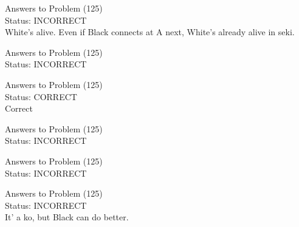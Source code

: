 \documentclass[11pt]{article}
\begin{document}
\begin{minipage}[t]{0.5\textwidth}
  {\centering
  
  Answers to Problem (125)\\
  Status: INCORRECT\\
  White's alive. Even if Black connects at A next, White's already alive in seki.\\
  }
\end{minipage}
\begin{minipage}[t]{0.5\textwidth}
  {\centering
  
  Answers to Problem (125)\\
  Status: INCORRECT\\
  
  }
\end{minipage}
\begin{minipage}[t]{0.5\textwidth}
  {\centering
  
  Answers to Problem (125)\\
  Status: CORRECT\\
  Correct\\
  }
\end{minipage}
\begin{minipage}[t]{0.5\textwidth}
  {\centering
  
  Answers to Problem (125)\\
  Status: INCORRECT\\
  
  }
\end{minipage}
\begin{minipage}[t]{0.5\textwidth}
  {\centering
  
  Answers to Problem (125)\\
  Status: INCORRECT\\
  
  }
\end{minipage}
\begin{minipage}[t]{0.5\textwidth}
  {\centering
  
  Answers to Problem (125)\\
  Status: INCORRECT\\
  It' a ko, but Black can do better.\\
  }
\end{minipage}
\end{document}
